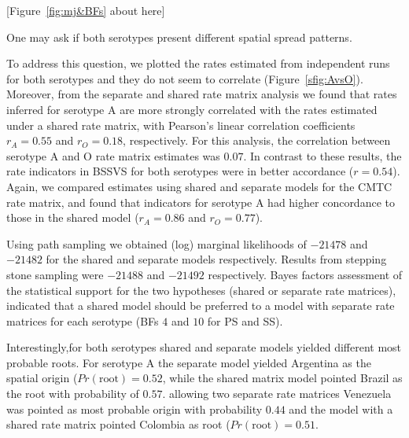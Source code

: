 \documentclass[10pt]{article}
\begin{document}
\begin{center}
 [Figure~\ref{fig:mj&BFs} about here]
\end{center}

One may ask if both serotypes present different spatial spread patterns.

To address this question, we plotted the rates estimated from independent runs for both serotypes and they do not seem to correlate (Figure~\ref{sfig:AvsO}).
Moreover, from the separate and shared rate matrix analysis we found that rates inferred for serotype A are more strongly correlated with the rates estimated under a shared rate matrix, with Pearson's linear correlation coefficients $r_A=0.55$ and $r_O=0.18$, respectively.
For this analysis, the correlation between serotype A and O rate matrix estimates was $0.07$.
In contrast to these results, the rate indicators in BSSVS for both serotypes were in better accordance ($r=0.54$).
Again, we compared estimates using shared and separate models for the CMTC rate matrix, and found that indicators for serotype A had higher concordance to those in the shared model ($r_A=0.86$ and $r_O=0.77$).

Using path sampling we obtained (log) marginal likelihoods of $-21478$ and $-21482$ for the shared and separate models respectively.
Results from stepping stone sampling were $-21488$ and $-21492$ respectively.
Bayes factors assessment of the statistical support for the two hypotheses (shared or separate rate matrices), indicated that a shared model should be preferred to a model with separate rate matrices for each serotype (BFs $4$ and $10$ for PS and SS).

Interestingly,for both serotypes shared and separate models yielded different most probable roots.
For serotype A the separate model yielded Argentina as the spatial origin ($Pr(\text{root})=0.52$, while the shared matrix model pointed Brazil as the root with probability of $0.57$.
allowing two separate rate matrices Venezuela was pointed as most probable origin with probability $0.44$ and the model with a shared rate matrix pointed Colombia as root ($Pr(\text{root})=0.51$.
\end{document}
